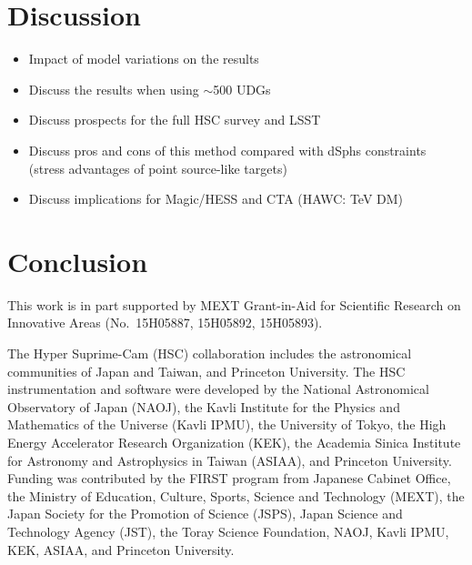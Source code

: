 \documentclass[a4paper,11pt]{article}
\begin{document}
\section{Discussion}
\begin{itemize}
    \item Impact of model variations on the results
    \item Discuss the results when using $\sim$500 UDGs
    \item Discuss prospects for the full HSC survey and LSST
    \item Discuss pros and cons of this method compared with dSphs constraints (stress advantages of point source-like targets)
    \item Discuss implications for Magic/HESS and CTA (HAWC: TeV DM) 
\end{itemize}

\section{Conclusion}

\acknowledgments
This work is in part supported by MEXT Grant-in-Aid for Scientific Research on Innovative Areas (No.~15H05887, 15H05892, 15H05893).


The Hyper Suprime-Cam (HSC) collaboration includes the astronomical
communities of Japan and Taiwan, and Princeton University.
The HSC instrumentation and software were developed by the National
Astronomical Observatory of Japan (NAOJ), the Kavli Institute for the
Physics and Mathematics of the Universe (Kavli IPMU), the University
of Tokyo, the High Energy Accelerator Research Organization (KEK), the
Academia Sinica Institute for Astronomy and Astrophysics in Taiwan
(ASIAA), and Princeton University.  Funding was contributed by the FIRST 
program from Japanese Cabinet Office, the Ministry of Education, Culture, 
Sports, Science and Technology (MEXT), the Japan Society for the 
Promotion of Science (JSPS),  Japan Science and Technology Agency 
(JST),  the Toray Science  Foundation, NAOJ, Kavli IPMU, KEK, ASIAA,  
and Princeton University.
\end{document}

